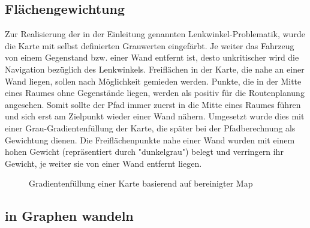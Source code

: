 \subsection{Flächengewichtung}
\label{sec:gewichtung}

Zur Realisierung der in der Einleitung genannten Lenkwinkel-Problematik, wurde die Karte mit selbst definierten Grauwerten eingefärbt. Je weiter das Fahrzeug von einem Gegenstand bzw. einer Wand entfernt ist, desto unkritischer wird die Navigation bezüglich des Lenkwinkels.
Freiflächen in der Karte, die nahe an einer Wand liegen, sollen nach Möglichkeit gemieden werden. Punkte, die in der Mitte eines Raumes ohne Gegenstände liegen, werden als positiv für die Routenplanung angesehen. 
Somit sollte der Pfad immer zuerst in die Mitte eines Raumes führen und sich erst am Zielpunkt wieder einer Wand nähern. 
Umgesetzt wurde dies mit einer Grau-Gradientenfüllung der Karte, die später bei der Pfadberechnung als Gewichtung dienen. Die Freiflächenpunkte nahe einer Wand wurden mit einem hohen Gewicht (repräsentiert durch "dunkelgrau") belegt und verringern ihr Gewicht, je weiter sie von einer Wand entfernt liegen. 

\begin{figure}
\caption{Gradientenfüllung einer Karte basierend auf bereinigter Map}
\end{figure}



\subsection{in Graphen wandeln}

